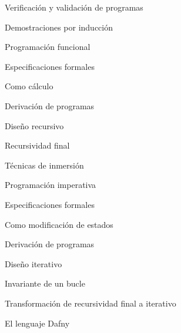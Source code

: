 \begin{longenum}
\begin{longenum}
        \item Verificación y validación de programas
        \begin{longenum}
            \item Demostraciones por inducción
        \end{longenum}
        \item Programación funcional
        \begin{longenum}
            \item Especificaciones formales
            \begin{longenum}
                \item Como cálculo
            \end{longenum}
            \item Derivación de programas
            \begin{longenum}
                \item Diseño recursivo
                \begin{longenum}
                    \item Recursividad final
                    \item Técnicas de inmersión \opcional\
                \end{longenum}
            \end{longenum}
        \end{longenum}
        \item Programación imperativa
        \begin{longenum}
            \item Especificaciones formales
            \begin{longenum}
                \item Como modificación de estados
            \end{longenum}
            \item Derivación de programas
            \begin{longenum}
                \item Diseño iterativo
                \begin{longenum}
                    \item Invariante de un bucle
                    \item Transformación de recursividad final a iterativo
                \end{longenum}
            \end{longenum}
        \end{longenum}
        \item El lenguaje Dafny \opcional\

\end{longenum}
\end{longenum}
